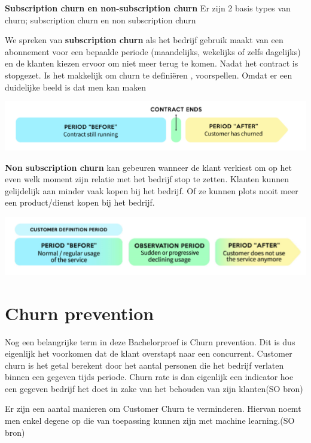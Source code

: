 \textbf{Subscription churn en non-subscription churn}
Er zijn 2 basis types van churn; subscription churn en non subscription churn

We spreken van \textbf{subscription churn} als het bedrijf gebruik maakt van een abonnement voor een bepaalde periode (maandelijks, wekelijks of zelfs dagelijks) en de klanten kiezen ervoor om niet meer terug te komen. Nadat het contract is stopgezet. Is het makkelijk om churn te definiëren , voorspellen. Omdat er een duidelijke beeld is dat men kan maken

\includegraphics[scale=0.7]{img/subscription-churn}

\textbf{Non subscription churn} kan gebeuren wanneer de klant verkiest om op het even welk moment zijn relatie met het bedrijf stop te zetten. Klanten kunnen gelijdelijk aan minder vaak kopen bij het bedrijf. Of ze kunnen plots nooit meer een product/dienst kopen bij het bedrijf.

\includegraphics[scale=0.8]{img/non-subscription-churn}

\section{Churn prevention}
\label{sec:Churn prevention}
Nog een belangrijke term in deze Bachelorproef is Churn prevention. Dit is dus eigenlijk het voorkomen dat de klant overstapt naar een concurrent. Customer churn is het getal berekent door het aantal personen die het bedrijf verlaten binnen een gegeven tijds periode. Churn rate is dan eigenlijk een indicator hoe een gegeven bedrijf het doet in zake van het behouden van zijn klanten(SO bron)

Er zijn een aantal manieren om Customer Churn te verminderen. Hiervan noemt men enkel degene op die van toepassing kunnen zijn met machine learning.(SO bron)

